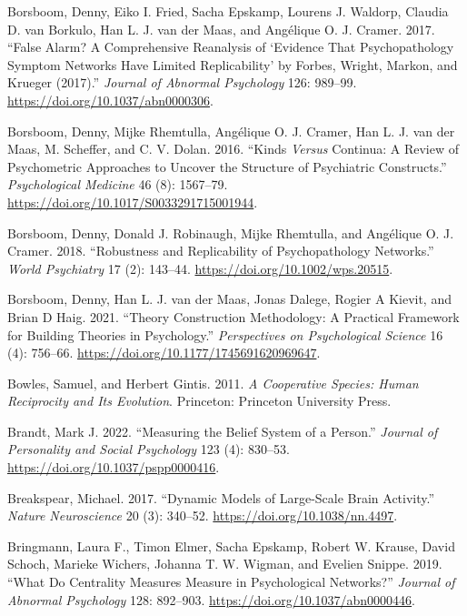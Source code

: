 \documentclass[
  a4paper,
  DIV=11,
  numbers=noendperiod,
  oneside]{scrreprt}
\newlength{\cslhangindent}
\newenvironment{CSLReferences}[2] %
 {\begin{list}{}{%
  \setlength{\itemindent}{0pt}
  \setlength{\leftmargin}{0pt}
  \setlength{\parsep}{0pt}
  \ifodd #1
   \setlength{\leftmargin}{\cslhangindent}
   \setlength{\itemindent}{-1\cslhangindent}
  \fi
  \setlength{\itemsep}{#2\baselineskip}}}
 {\end{list}}
\begin{document}
\begin{CSLReferences}{1}{0}
Borsboom, Denny, Eiko I. Fried, Sacha Epskamp, Lourens J. Waldorp,
Claudia D. van Borkulo, Han L. J. van der Maas, and Angélique O. J.
Cramer. 2017. {``False Alarm? {A} Comprehensive Reanalysis of
{`{Evidence} That Psychopathology Symptom Networks Have Limited
Replicability'} by {Forbes}, {Wright}, {Markon}, and {Krueger}
(2017).''} \emph{Journal of Abnormal Psychology} 126: 989--99.
\url{https://doi.org/10.1037/abn0000306}.

Borsboom, Denny, Mijke Rhemtulla, Angélique O. J. Cramer, Han L. J. van
der Maas, M. Scheffer, and C. V. Dolan. 2016. {``Kinds {\emph{Versus}}
Continua: A Review of Psychometric Approaches to Uncover the Structure
of Psychiatric Constructs.''} \emph{Psychological Medicine} 46 (8):
1567--79. \url{https://doi.org/10.1017/S0033291715001944}.

Borsboom, Denny, Donald J. Robinaugh, Mijke Rhemtulla, and Angélique O.
J. Cramer. 2018. {``Robustness and Replicability of Psychopathology
Networks.''} \emph{World Psychiatry} 17 (2): 143--44.
\url{https://doi.org/10.1002/wps.20515}.

Borsboom, Denny, Han L. J. van der Maas, Jonas Dalege, Rogier A Kievit,
and Brian D Haig. 2021. {``Theory {Construction Methodology}: {A
Practical Framework} for {Building Theories} in {Psychology}.''}
\emph{Perspectives on Psychological Science} 16 (4): 756--66.
\url{https://doi.org/10.1177/1745691620969647}.

Bowles, Samuel, and Herbert Gintis. 2011. \emph{A Cooperative Species:
Human Reciprocity and Its Evolution}. {Princeton}: {Princeton University
Press}.

Brandt, Mark J. 2022. {``Measuring the Belief System of a Person.''}
\emph{Journal of Personality and Social Psychology} 123 (4): 830--53.
\url{https://doi.org/10.1037/pspp0000416}.

Breakspear, Michael. 2017. {``Dynamic Models of Large-Scale Brain
Activity.''} \emph{Nature Neuroscience} 20 (3): 340--52.
\url{https://doi.org/10.1038/nn.4497}.

Bringmann, Laura F., Timon Elmer, Sacha Epskamp, Robert W. Krause, David
Schoch, Marieke Wichers, Johanna T. W. Wigman, and Evelien Snippe. 2019.
{``What Do Centrality Measures Measure in Psychological Networks?''}
\emph{Journal of Abnormal Psychology} 128: 892--903.
\url{https://doi.org/10.1037/abn0000446}.


\end{CSLReferences}
\end{document}
